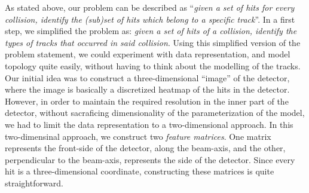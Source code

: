 As stated above, our problem can be described as ``\emph{given a set of hits for every collision, identify the (sub)set of hits which belong to a specific track}''. In a first step, we simplified the problem as: \emph{given a set of hits of a collision, identify the types of tracks that occurred in said collision}. Using this simplified version of the problem statement, we could experiment with data representation, and model topology quite easily, without having to think about the modelling of the tracks. Our initial idea was to construct a three-dimensional ``image'' of the detector, where the image is basically a discretized heatmap of the hits in the detector. However, in order to maintain the required resolution in the inner part of the detector, without sacraficing dimensionality of the parameterization of the model, we had to limit the data representation to a two-dimensional approach. In this two-dimensinal approach, we construct two \emph{feature matrices}. One matrix represents the front-side of the detector, along the beam-axis, and the other, perpendicular to the beam-axis, represents the side of the detector. Since every hit is a three-dimensional coordinate, constructing these matrices is quite straightforward.

